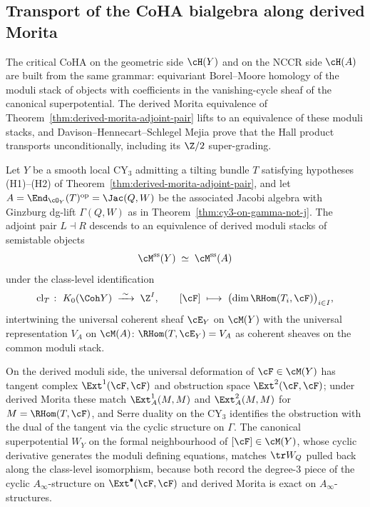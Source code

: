 \subsection{Transport of the CoHA bialgebra along derived Morita}
\label{subsec:dhsm-hall-transport}

The critical CoHA on the geometric side $\cH(Y)$ and on the NCCR side $\cH(A)$ are built from the same grammar: equivariant Borel--Moore homology of the moduli stack of objects with coefficients in the vanishing-cycle sheaf of the canonical superpotential. The derived Morita equivalence of Theorem~\ref{thm:derived-morita-adjoint-pair} lifts to an equivalence of these moduli stacks, and Davison--Hennecart--Schlegel Mejia prove that the Hall product transports unconditionally, including its $\Z/2$ super-grading.

\begin{theorem}
\label{thm:moduli-morita-dhsm}
Let $Y$ be a smooth local CY$_3$ admitting a tilting bundle $T$ satisfying hypotheses (H1)--(H2) of Theorem~\ref{thm:derived-morita-adjoint-pair}, and let $A = \End_{\cO_Y}(T)^{\mathrm{op}} = \Jac(Q, W)$ be the associated Jacobi algebra with Ginzburg dg-lift $\Gamma(Q, W)$ as in Theorem~\ref{thm:cy3-on-gamma-not-j}. The adjoint pair $L \dashv R$ descends to an equivalence of derived moduli stacks of semistable objects
\[
 \cM^{\mathrm{ss}}(Y) \;\simeq\; \cM^{\mathrm{ss}}(A)
\]
under the class-level identification
\[
 \mathrm{cl}_T \;\colon\; K_{0}(\Coh Y) \;\xrightarrow{\;\sim\;}\; \Z^{I},
 \qquad
 [\cF] \;\longmapsto\; \bigl(\dim \RHom(T_i, \cF)\bigr)_{i \in I},
\]
intertwining the universal coherent sheaf $\cE_Y$ on $\cM(Y)$ with the universal representation $V_A$ on $\cM(A)$: $\RHom(T, \cE_Y) = V_A$ as coherent sheaves on the common moduli stack.
\end{theorem}

On the derived moduli side, the universal deformation of $\cF \in \cM(Y)$ has tangent complex $\Ext^{1}(\cF, \cF)$ and obstruction space $\Ext^{2}(\cF, \cF)$; under derived Morita these match $\Ext^{1}_A(M, M)$ and $\Ext^{2}_A(M, M)$ for $M = \RHom(T, \cF)$, and Serre duality on the CY$_3$ identifies the obstruction with the dual of the tangent via the cyclic structure on $\Gamma$. The canonical superpotential $W_Y$ on the formal neighbourhood of $[\cF] \in \cM(Y)$, whose cyclic derivative generates the moduli defining equations, matches $\tr W_Q$ pulled back along the class-level isomorphism, because both record the degree-$3$ piece of the cyclic $A_\infty$-structure on $\Ext^{\bullet}(\cF, \cF)$ and derived Morita is exact on $A_\infty$-structures.

